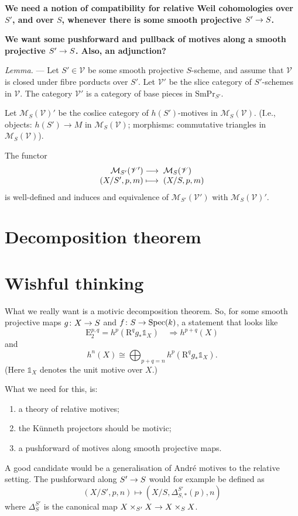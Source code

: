 \documentclass[a4paper,10pt]{article}
\def\fixme{\textbf}
\newenvironment{lemma}{\medskip\textit{Lemma.} --- }{}
\def\basepieces{\mathscr{V}}
\def\smpr{\mathrm{SmPr}}
\begin{document}
\fixme{We need a notion of compatibility for relative Weil cohomologies over
	$S'$, and over $S$, whenever there is some smooth projective
$\map{S'}{S}$.}

\fixme{We want some pushforward and pullback of motives along a smooth
projective $\map{S'}{S}$. Also, an adjunction?}

\begin{lemma} %
	Let $S' \in \basepieces$ be some smooth projective $S$-scheme, and
	assume that $\basepieces$ is closed under fibre porducts over $S'$. Let
	$\basepieces'$ be the slice category of $S'$-schemes in $\basepieces$.
	The category $\basepieces'$ is a category of base pieces in
	$\smpr_{S'}$.

	Let $\mathcal{M}_{S}(\basepieces)'$ be the coslice category of
	$h(S')$-motives in $\mathcal{M}_{S}(\basepieces)$. (I.e., objects:
	$h(S') \to M$ in $\mathcal{M}_{S}(\basepieces)$; morphisms: commutative
	triangles in $\mathcal{M}_{S}(\basepieces)$).

	The functor
	\[
		\map{\mathcal{M}_{S'}(\basepieces')}%
		{\mathcal{M}_{S}(\basepieces)}%
		[(X/S', p, m)][(X/S, p, m)]
	\]
	is well-defined and induces and equivalence of
	$\mathcal{M}_{S'}(\basepieces')$ with $\mathcal{M}_{S}(\basepieces)'$.
\end{lemma} %


\section{Decomposition theorem}

\section{Wishful thinking}

What we really want is a motivic decomposition theorem. So, for some smooth
projective maps $\map[g]{X}{S}$ and $\map[f]{S}{\mathrm{Spec}(k)}$, a statement
that looks like
\[
	\mathrm{E}_{2}^{p,q} = h^{p}(\mathrm{R}^{q}g_{*} \mathbb{1}_{X})
	\quad \Longrightarrow h^{p+q}(X)
\]
and
\[
	h^{n}(X) \cong \bigoplus_{p+q = n} h^{p}(\mathrm{R}^{q}g_{*}
	\mathbb{1}_{X}).
\]
(Here $\mathbb{1}_{X}$ denotes the unit motive over $X$.)

What we need for this, is:
\begin{enumerate} %
	\item a theory of relative motives;
	\item the K\"{u}nneth projectors should be motivic;
	\item a pushforward of motives along smooth projective maps.
\end{enumerate} %
A good candidate would be a generalisation of Andr\'{e} motives to the relative
setting. The pushforward along $\map{S'}{S}$ would for example be defined as
\[
	(X/S', p, n) \mapsto (X/S, \Delta^{S'}_{S,*}(p), n)
\]
where $\Delta^{S'}_{S}$ is the canonical map $\map{X \times_{S'} X}{X
\times_{S} X}$.
\end{document}
